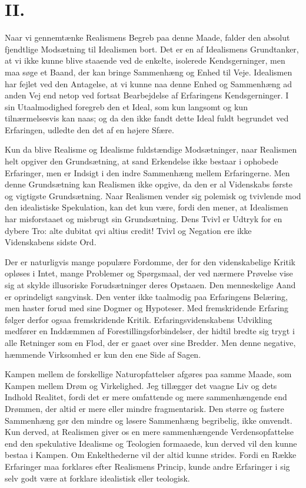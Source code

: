 \documentclass[12pt,a4paper]{article}
\newcommand{\opage}[1]{\marginnote{\footnotesize\textit{[#1]}}}
\begin{document}
\section*{II.}

Naar vi gennemtænke Realismens Begreb paa denne Maade, falder den
absolut fjendtlige Modsætning til Idealismen bort. Det er en af
Idealismens Grundtanker, at vi ikke kunne blive staaende ved de
enkelte, isolerede Kendsgerninger, men maa søge et Baand, der kan
bringe Sammenhæng og Enhed til Veje. Idealismen har fejlet ved den
Antagelse, at vi kunne naa denne Enhed og Sammenhæng ad anden Vej end
netop ved fortsat Bearbejdelse af Erfaringens Kendsgerninger. I sin
Utaalmodighed foregreb den et Ideal, som
\opage{5}kun langsomt og kun
tilnærmelsesvis kan naas; og da den ikke fandt dette Ideal fuldt
begrundet ved Erfaringen, udledte den det af en højere Sfære.

Kun da blive Realisme og Idealisme fuldstændige Modsætninger, naar
Realismen helt opgiver den Grundsætning, at sand Erkendelse ikke bestaar
i ophobede Erfaringer, men er Indsigt i den indre Sammenhæng mellem
Erfaringerne. Men denne Grundsætning kan Realismen ikke opgive, da den
er al Videnskabs første og vigtigste Grundsætning. Naar Realismen vender
sig polemisk og tvivlende mod den idealistiske Spekulation, kan det kun
være, fordi den mener, at Idealismen har misforstaaet og misbrugt sin
Grundsætning. Dens Tvivl er Udtryk for en dybere Tro: alte
dubitat qvi altius credit! Tvivl og Negation ere ikke Videnskabens
sidste Ord.

Der er naturligvis mange populære Fordomme, der for den videnskabelige
Kritik opløses i Intet, mange Problemer og Spørgsmaal, der ved nærmere
Prøvelse vise sig at skylde illusoriske Forudsætninger deres Opstaaen.
Den menneskelige Aand er oprindeligt sangvinsk. Den venter ikke
taalmodig paa Erfaringens Belæring, men haster forud med sine Dogmer og
Hypoteser. Med fremskridende Erfaring følger derfor ogsaa fremskridende
Kritik. Erfaringsvidenskabens Udvikling medfører en Inddæmmen af
Forestillingsforbindelser, der hidtil bredte sig trygt i alle Retninger
som en Flod, der er gaaet over sine Bredder. Men denne negative,
hæmmende Virksomhed er kun den ene Side af Sagen.

Kampen mellem de forskellige Naturopfattelser afgøres paa samme Maade,
som Kampen mellem Drøm og Virkelighed. Jeg tillægger det vaagne Liv og
dets Indhold Realitet, fordi det er mere omfattende og mere
sammenhængende end Drømmen, der altid er mere eller mindre
fragmentarisk. Den større og fastere Sammenhæng gør den mindre og løsere
Sammenhæng begribelig, ikke omvendt. Kun derved, at Realismen giver os
en mere sammenhængende Verdensopfattelse end den spekulative Idealisme
og Teologien formaaede, kun derved vil den kunne bestaa i Kampen. Om
Enkelthederne vil der altid kunne strides. Fordi en Række Erfaringer maa
forklares efter Realismens Princip, kunde andre
\opage{6}Erfaringer i sig selv
godt være at forklare idealistisk eller teologisk.
\end{document}
